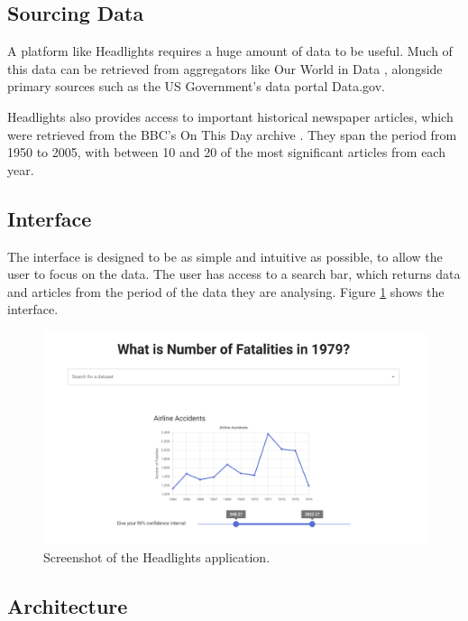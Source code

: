 \documentclass{article}
\begin{document}
\subsection{Sourcing Data}

A platform like Headlights requires a huge amount of data to be useful. Much of this data can be retrieved from aggregators like Our World in Data \cite{ourworldindata}, alongside primary sources such as the US Government's data portal Data.gov.

Headlights also provides access to important historical newspaper articles, which were retrieved from the BBC's On This Day archive \cite{onthisday}. They span the period from 1950 to 2005, with between 10 and 20 of the most significant articles from each year.

\subsection{Interface}

The interface is designed to be as simple and intuitive as possible, to allow the user to focus on the data. The user has access to a search bar, which returns data and articles from the period of the data they are analysing. Figure \ref{fig:screenshot} shows the interface.

\begin{figure}[h]
  \centering
  \includegraphics[width=\textwidth]{screenshot.png}
  \caption{Screenshot of the Headlights application.}
  \label{fig:screenshot}
\end{figure}

\newpage

\subsection{Architecture}
\end{document}
